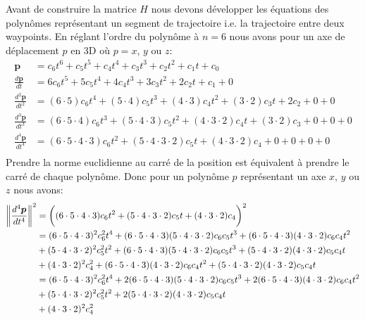 Avant de construire la matrice $H$ nous devons développer les équations des polynômes représentant un segment de trajectoire i.e. la trajectoire entre deux waypoints. En réglant l'ordre du polynôme à $n = 6$ nous avons pour un axe de déplacement $p$ en 3D où $p = x$, $y$ ou $z$:
\begin{align*}
\boldsymbol{p} &= c_6 t^6 + c_5 t^5 + c_4 t^4 + c_3 t^3 + c_2 t^2+ c_1 t + c_0\\
\frac{d \boldsymbol{p}}{dt} &= 6 c_6 t^5 + 5 c_5 t^4 + 4 c_4 t^3 + 3 c_3 t^2 + 2c_2 t + c_1 + 0\\
\frac{d^2 \boldsymbol{p}}{dt^2} &=
	(6\cdot 5) c_6 t^4 + (5 \cdot 4) c_5 t^3 + (4 \cdot 3) c_4 t^2 + (3 \cdot 2) c_3 t + 2c_2 + 0 + 0\\
\frac{d^3 \boldsymbol{p}}{dt^3} &=
	(6\cdot 5\cdot 4) c_6 t^3 + (5 \cdot 4\cdot 3) c_5 t^2 + (4 \cdot 3\cdot 2 ) c_4 t + (3 \cdot 2) c_3 + 0 + 0 + 0\\
\frac{d^4 \boldsymbol{p}}{dt^4} &=
	(6\cdot 5\cdot 4\cdot 3) c_6 t^2 + (5 \cdot 4\cdot 3\cdot 2) c_5 t + (4 \cdot 3\cdot 2 ) c_4 + 0 + 0 + 0 + 0\\
\end{align*}
Prendre la norme euclidienne au carré de la position est équivalent à prendre le carré de chaque polynôme. Donc pour un polynôme $p$ représentant un axe $x$, $y$ ou $z$ nous avons:
\begin{align}\label{eq:polynome_derive}
\left\lVert\frac{d^4 \boldsymbol{p}}{dt^4}\right\rVert^2 &=
	\bigg((6\cdot 5\cdot 4\cdot 3) c_6 t^2 + (5 \cdot 4\cdot 3\cdot 2) c_5 t + (4 \cdot 3\cdot 2 ) c_4 \bigg)^2 \\
	&=	(6\cdot 5\cdot 4\cdot 3)^2 c_6^2 t^4 + (6\cdot 5\cdot 4\cdot 3)(5 \cdot 4\cdot 3\cdot 2) c_6 c_5 t^3 + (6 \cdot 5 \cdot 4\cdot 3)(4\cdot 3\cdot 2)c_6 c_4 t^2 \nonumber\\
	&	+ (5 \cdot 4\cdot 3\cdot 2)^2 c_5^2 t^2 + (6\cdot 5\cdot 4\cdot 3)(5 \cdot 4\cdot 3\cdot 2) c_6 c_5 t^3 + (5 \cdot 4\cdot 3\cdot 2)(4\cdot 3\cdot 2)c_5 c_4 t \nonumber\\
	&	+ (4\cdot 3\cdot 2)^2 c_4^2 + (6 \cdot 5 \cdot 4\cdot 3)(4\cdot 3\cdot 2)c_6 c_4 t^2 + (5 \cdot 4\cdot 3\cdot 2)(4\cdot 3\cdot 2)c_5 c_4 t \nonumber\\
	& = (6\cdot 5\cdot 4\cdot 3)^2 c_6^2 t^4 + 2(6\cdot 5\cdot 4\cdot 3)(5 \cdot 4\cdot 3\cdot 2) c_6 c_5 t^3 + 2(6 \cdot 5 \cdot 4\cdot 3)(4\cdot 3\cdot 2)c_6 c_4 t^2 \nonumber\\
	&	+ (5 \cdot 4\cdot 3\cdot 2)^2 c_5^2 t^2 + 2 (5 \cdot 4\cdot 3\cdot 2)(4\cdot 3\cdot 2)c_5 c_4 t \nonumber\\
	&	+ (4\cdot 3\cdot 2)^2 c_4^2 \nonumber
\end{align}

